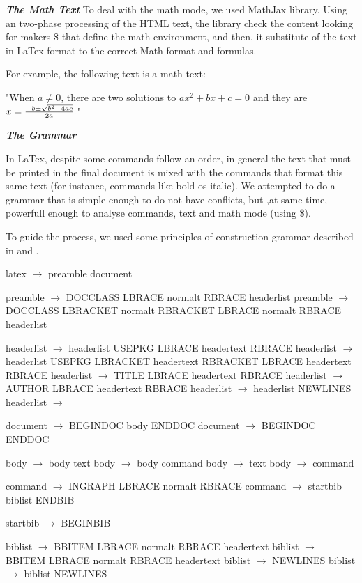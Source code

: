 \documentclass{article}
\begin{document}
\textit{\textbf{The Math Text}}
To deal with the math mode, we used MathJax library. Using an two-phase processing of the HTML text, the library check the content looking for makers \$ that define the math environment, and then, it substitute of the text in LaTex format to the correct Math format and formulas.

For example, the following text is a math text:

"When $a \ne 0$, there are two solutions to $ax^2 + bx + c = 0$ and they are $x = {-b \pm \sqrt{b^2-4ac} \over 2a}.$"

\textit{\textbf{The Grammar}}

In LaTex, despite some commands follow an order, in general the text that must be printed in the final document is mixed with the commands that format this same text (for instance, commands like bold os italic). We attempted to do a grammar that is simple enough to do not have conflicts, but ,at same time, powerfull enough to analyse commands, text and math mode (using \$).

To guide the process, we used some principles of construction grammar described in \cite{Appel02} and \cite{Aho86}.

latex $\rightarrow$ preamble document

preamble $\rightarrow$ DOCCLASS LBRACE normalt RBRACE headerlist 
preamble $\rightarrow$ DOCCLASS LBRACKET normalt RBRACKET LBRACE normalt RBRACE headerlist

headerlist $\rightarrow$ headerlist USEPKG LBRACE headertext RBRACE
headerlist $\rightarrow$ headerlist USEPKG LBRACKET headertext RBRACKET LBRACE headertext RBRACE
headerlist $\rightarrow$ TITLE LBRACE headertext RBRACE
headerlist $\rightarrow$ AUTHOR LBRACE headertext RBRACE
headerlist $\rightarrow$ headerlist NEWLINES
headerlist $\rightarrow$

document $\rightarrow$ BEGINDOC body ENDDOC
document $\rightarrow$ BEGINDOC ENDDOC

body $\rightarrow$ body text
body $\rightarrow$ body command
body $\rightarrow$ text
body $\rightarrow$ command

command $\rightarrow$ INGRAPH LBRACE normalt RBRACE
command $\rightarrow$ startbib biblist ENDBIB

startbib $\rightarrow$ BEGINBIB

biblist $\rightarrow$  BBITEM LBRACE normalt RBRACE headertext
biblist $\rightarrow$ BBITEM LBRACE normalt RBRACE headertext
biblist $\rightarrow$ NEWLINES
biblist $\rightarrow$ biblist NEWLINES
\end{document}
